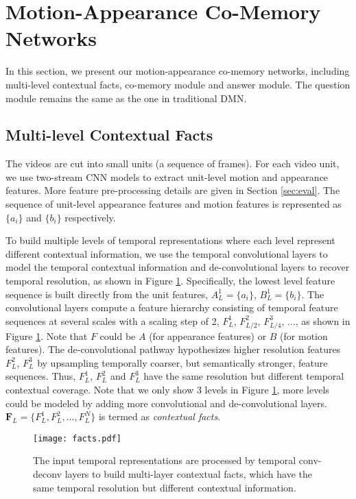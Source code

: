 \documentclass[10pt,twocolumn,letterpaper]{article}
\begin{document}
\section{Motion-Appearance Co-Memory Networks}

\label{sec:method}
In this section, we present our motion-appearance co-memory networks, including multi-level contextual facts,  co-memory module and answer module. The question module remains the same as the one in traditional DMN.

\subsection{Multi-level Contextual Facts}
\label{sec:facts}
The videos are cut into small units \cite{Gao_2017_ICCV_TURN} (a sequence of frames). For each video unit, we use two-stream CNN models \cite{xiong2016cuhk} to extract unit-level motion and appearance features. More feature pre-processing details are given in Section \ref{sec:eval}. The sequence of unit-level appearance features and motion features is represented as $\{a_{i}\}$ and $\{b_{i}\}$ respectively. 

To build multiple levels of temporal representations where each level represent different contextual information, we use the temporal convolutional layers to model the temporal contextual information and de-convolutional layers to recover temporal resolution, as shown in Figure \ref{fig:facts}. Specifically, the lowest level feature sequence is built directly from the unit features, $A^1_{L}=\{a_{i}\}$, $B^1_{L}=\{b_{i}\}$. The convolutional layers compute a feature hierarchy consisting of temporal feature sequences at several scales with a scaling step of 2, $F^1_{L}$, $F^2_{L/2}$, $F^3_{L/4}$, ..., as shown in Figure \ref{fig:facts}. Note that $F$ could be $A$ (for appearance features) or $B$ (for motion features). The de-convolutional pathway hypothesizes higher resolution features $F^2_{L}$, $F^3_{L}$ by upsampling temporally coarser, but semantically stronger, feature sequences. Thus, $F^1_{L}$, $F^2_{L}$ and $F^3_{L}$ have the same resolution but different temporal contextual coverage. Note that we only show 3 levels in Figure \ref{fig:facts}, more levels could be modeled by adding more convolutional and de-convolutional layers. $\mathbf F_L=\{F^1_{L}, F^2_{L}, ... , F^N_{L}\}$ is termed as \emph{contextual facts}.


\begin{figure}[]
  \centering
    \texttt{[image: facts.pdf]}
    \caption{The input temporal representations are processed by temporal conv-deconv layers to build multi-layer contextual facts, which have the same temporal resolution but different contextual information.}
      \label{fig:facts}
\end{figure}
\end{document}
